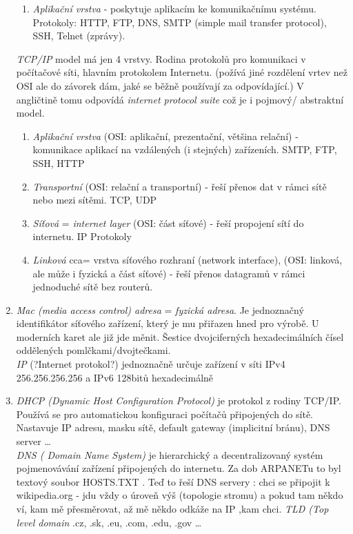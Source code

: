 \documentclass[12pt]{article}
\begin{document}
\begin{enumerate}
\begin{enumerate}
\item \emph{Aplikační vrstva} - poskytuje aplikacím ke komunikačnímu systému. Protokoly: HTTP, FTP, DNS, SMTP (simple mail transfer protocol), SSH, Telnet (zprávy).
\end{enumerate}
\emph{TCP/IP} model má jen 4 vrstvy. Rodina protokolů pro komunikaci v počítačové síti, hlavním protokolem Internetu. (požívá jiné rozdělení vrtev než OSI ale do závorek dám, jaké se běžně používají za odpovídající.) V angličtině tomu odpovídá \emph{internet protocol suite} což je i pojmový/ abstraktní model.
\begin{enumerate}
\item \emph{Aplikační vrstva} (OSI: aplikační, prezentační, většina relační) - komunikace aplikací na vzdálených (i stejných) zařízeních. SMTP, FTP, SSH, HTTP
\item \emph{Transportní} (OSI: relační a transportní) - řeší přenos dat v rámci sítě nebo mezi sítěmi. TCP, UDP
\item \emph{Síťová} = \emph{internet layer} (OSI: část síťové) - řeší propojení sítí do internetu. IP Protokoly
\item \emph{Linková} cca= vrstva síťového rozhraní (network interface), (OSI: linková, ale může i fyzická a část síťové) - řeší přenos datagramů v rámci jednoduché sítě bez routerů.
\end{enumerate}
\item \emph{Mac (media access control) adresa} = \emph{fyzická adresa}. Je jednoznačný identifikátor síťového zařízení, který je mu přiřazen hned pro výrobě. U moderních karet ale již jde měnit. Šestice dvojciferných hexadecimálních čísel oddělených pomlčkami/dvojtečkami.\\
\emph{IP} (?Internet protokol?) jednoznačně určuje zařízení v síti IPv4 256.256.256.256 a IPv6 128bitů hexadecimálně
\item \emph{DHCP (Dynamic Host Configuration Protocol)} je protokol z rodiny TCP/IP. Používá se pro automatickou konfiguraci počítačů připojených do sítě. Nastavuje IP adresu, masku sítě,  default gateway (implicitní bránu), DNS server \dots \\
\emph{DNS ( Domain Name System)} je hierarchický a decentralizovaný systém pojmenovávání zařízení připojených do internetu. Za dob ARPANETu  to byl textový soubor HOSTS.TXT . Teď to řeší DNS servery : chci se připojit k wikipedia.org - jdu vždy o úroveň výš (topologie stromu) a pokud tam někdo ví, kam mě přesměrovat, až mě někdo odkáže na IP ,kam chci. \emph{TLD (Top level domain} .cz, .sk, .eu, .com, .edu, .gov  \dots\\

\end{enumerate}
\end{document}
